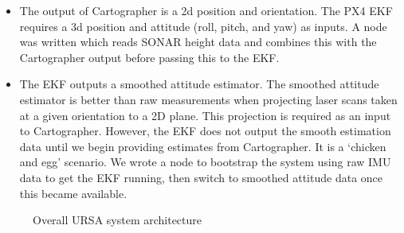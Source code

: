\documentclass[capstone_report.tex]{subfiles}
\begin{document}
\begin{itemize}
	\item The output of Cartographer is a 2d position and orientation. The PX4 EKF requires a 3d position and attitude (roll, pitch, and yaw) as inputs. A node was written which reads SONAR height data and combines this with the Cartographer output before passing this to the EKF.
	\item The EKF outputs a smoothed attitude estimator. The smoothed attitude estimator is better than raw measurements when projecting laser scans taken at a given orientation to a 2D plane. This projection is required as an input to Cartographer. However, the EKF does not output the smooth estimation data until we begin providing estimates from Cartographer. It is a `chicken and egg' scenario. We wrote a node to bootstrap the system using raw IMU data to get the EKF running, then switch to smoothed attitude data once this became available.
\end{itemize}

\pagebreak
\begin{landscape}
\thispagestyle{empty}
\hspace{0pt}
\vfill
\begin{figure}[H]
	\centering
	
	\caption{Overall URSA system architecture\label{fig:overArch}}
\end{figure}
\vfill
\end{landscape}
\pagebreak
\end{document}

